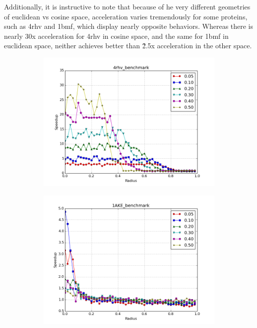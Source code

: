 \documentclass{amsbook}
\theoremstyle{definition}
\theoremstyle{remark}
\numberwithin{equation}{section}
\begin{document}
Additionally, it is instructive to note that because of he very different geometries of euclidean vs cosine space, acceleration varies tremendously for some proteins, such as 4rhv and 1bmf, which display nearly opposite behaviors.
Whereas there is nearly 30x acceleration for 4rhv in cosine space, and the same for 1bmf in euclidean space, neither achieves better than \~2.5x acceleration in the other space.

\begin{figure}[tbp]
    \centering
    \begin{subfigure}[b]{0.49\textwidth}
        \includegraphics[width=1\textwidth]{assets/4rhv_benchmark_cosine}
        \caption{}
    \end{subfigure}%
    \begin{subfigure}[b]{0.49\textwidth}
        \includegraphics[width=1\textwidth]{assets/1AKE_benchmark_cosine}

\end{subfigure}
\end{figure}
\end{document}
